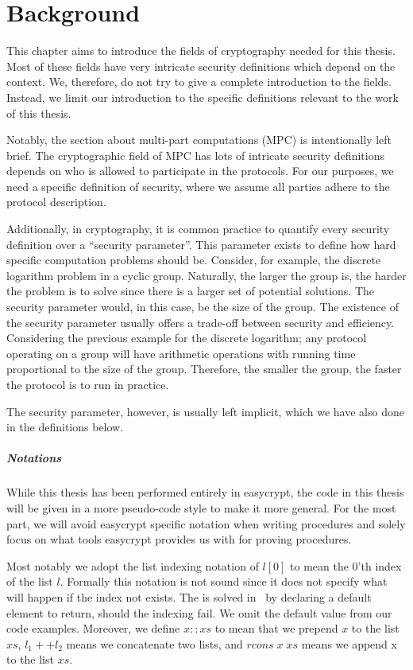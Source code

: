 \chapter{Background}
\label{ch:background}
This chapter aims to introduce the fields of cryptography needed for this
thesis.
Most of these fields have very intricate security definitions which depend on the
context.
We, therefore, do not try to give a complete introduction to the fields.
Instead, we limit our introduction to the specific definitions relevant to the work of this thesis.

Notably, the section about multi-part computations (MPC) is intentionally left brief. The
cryptographic field of MPC has lots of intricate security definitions
depends on who is allowed to participate in the protocols. For our purposes, we
need a specific definition of security, where we assume all parties
adhere to the protocol description.

Additionally, in cryptography, it is common practice to quantify every security
definition over a ``security parameter''. This parameter exists to define how
hard specific computation problems should be. Consider, for example, the discrete
logarithm problem in a cyclic group. Naturally, the larger the group is,
the harder the problem is to solve since there is a larger set of potential solutions. The
security parameter would, in this case, be the size of the group.
The existence of the security parameter usually offers a trade-off between
security and efficiency. Considering the previous example for the discrete
logarithm; any protocol operating on a group will have arithmetic operations
with running time proportional to the size of the group. Therefore, the smaller
the group, the faster the protocol is to run in practice.

The security parameter, however, is usually left implicit, which we have also
done in the definitions below.

\paragraph{Notations}
While this thesis has been performed entirely in easycrypt, the code in this
thesis will be given in a more pseudo-code style to make it more general. For
the most part, we will avoid easycrypt specific notation when writing procedures
and solely focus on what tools easycrypt provides us with for proving
procedures.

Most notably we adopt the list indexing notation of $l[0]$ to mean the 0'th
index of the list $l$. Formally this notation is not sound since it does not
specify what will happen if the index not exists. The is solved in \easycrypt\
by declaring a default element to return, should the indexing fail. We omit 
the default value from our code examples.
Moreover, we define $x::xs$ to mean that we prepend $x$ to the list $xs$,
$l_{1} ++ l_{2}$ means we concatenate two lists, and $rcons \; x \; xs$ means we
append x to the list $xs$.


